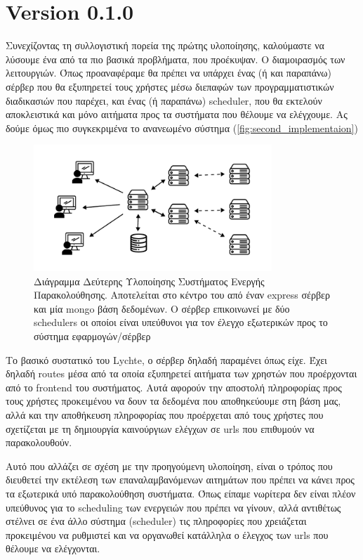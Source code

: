 \newpage

\section{Version 0.1.0}
\label{section:second_implementation}

Συνεχίζοντας τη συλλογιστική πορεία της πρώτης υλοποίησης, καλούμαστε να λύσουμε ένα από τα πιο βασικά προβλήματα, που προέκυψαν.
Ο διαμοιρασμός των λειτουργιών. Όπως προαναφέραμε θα πρέπει να υπάρχει ένας (ή και παραπάνω) σέρβερ που θα εξυπηρετεί
τους χρήστες μέσω διεπαφών των προγραμματιστικών διαδικασιών που παρέχει, και ένας (ή παραπάνω) scheduler, που θα εκτελούν
αποκλειστικά και μόνο αιτήματα προς τα συστήματα που θέλουμε να ελέγχουμε. Ας δούμε όμως πιο συγκεκριμένα το ανανεωμένο σύστημα (\autoref{fig:second_implementaion})

\begin{figure}[!ht]
	\centering
	\includegraphics[width=0.8\textwidth]{./images/chapter4/lychte-second-implementation.png}
	\caption[Διάγραμμα δεύτερης Υλοποίησης]{Διάγραμμα Δεύτερης Υλοποίησης Συστήματος Ενεργής Παρακολούθησης. Αποτελείται στο κέντρο του από έναν express σέρβερ και μία mongo βάση δεδομένων. Ο σέρβερ επικοινωνεί με δύο schedulers οι οποίοι είναι υπεύθυνοι για τον έλεγχο εξωτερικών προς το σύστημα εφαρμογών/σέρβερ}
	\label{fig:second_implementaion}
\end{figure}

Το βασικό συστατικό του Lychte, ο σέρβερ δηλαδή παραμένει όπως είχε. Έχει δηλαδή routes μέσα από τα οποία εξυπηρετεί αιτήματα
των χρηστών που προέρχονται από το frontend του συστήματος. Αυτά αφορούν την αποστολή πληροφορίας προς τους χρήστες προκειμένου να δουν
τα δεδομένα που αποθηκεύουμε στη βάση μας, αλλά και την αποθήκευση πληροφορίας που προέρχεται από τους χρήστες που σχετίζεται με τη δημιουργία
καινούργιων ελέγχων σε urls που επιθυμούν να παρακολουθούν.

Αυτό που αλλάζει σε σχέση με την προηγούμενη υλοποίηση, είναι ο τρόπος που διευθετεί
την εκτέλεση των επαναλαμβανόμενων αιτημάτων που πρέπει να κάνει προς τα εξωτερικά υπό παρακολούθηση συστήματα.
Όπως είπαμε νωρίτερα δεν είναι πλέον υπεύθυνος για το scheduling των ενεργειών που πρέπει να γίνουν,
αλλά αντιθέτως στέλνει σε ένα άλλο σύστημα (scheduler) τις πληροφορίες που χρειάζεται προκειμένου να ρυθμιστεί και να οργανωθεί κατάλληλα
ο έλεγχος των urls που θέλουμε να ελέγχονται.

